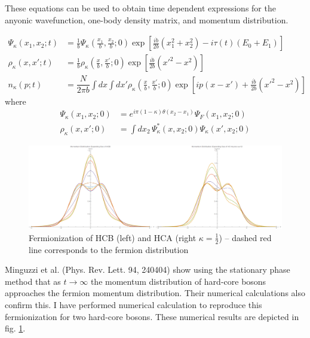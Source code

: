 \documentclass[onecolumn,english,aps,pra]{revtex4}
\begin{document}
These equations can be used to obtain time dependent expressions for the anyonic wavefunction, one-body density matrix, and momentum distribution.

\begin{align*}
\Psi_{\kappa}(x_{1}, x_{2}; t) & = 
\frac{1}{b} \Psi_{\kappa}(\frac{x_{1}}{b}, \frac{x_{2}}{b}; 0)
\exp \left[ \frac{i \dot{b}}{2 b} (x_{1}^2 + x_{2}^2) - i \tau(t) (E_0 + E_1) \right]\\
\rho_{\kappa}(x, x'; t) & = \frac{1}{b} \rho_{\kappa}(\frac{x}{b}, \frac{x'}{b}; 0)
\exp \left[ \frac{i \dot{b}}{2 b} (x'^2 - x^2) \right]\\
n_{\kappa}(p ; t) & = \dfrac{N}{2\pi b} \int dx \int dx' 
\rho_{\kappa}(\frac{x}{b}, \frac{x'}{b}; 0)
\exp \left[ip(x - x') +	 \frac{i \dot{b}}{2 b} (x'^2 - x^2) \right]
\end{align*}
where
\begin{align*}
\Psi_{\kappa}(x_{1}, x_{2}; 0) & = 
e^{i \pi (1 - \kappa) \theta(x_{2} - x_{1})} \Psi_{F}(x_{1}, x_{2}; 0)\\
\rho_{\kappa}(x, x'; 0) & = \int dx_2 \, \Psi_{\kappa}^*(x,x_2; 0) \Psi_\kappa(x',x_2; 0)
\end{align*}

\begin{center}
\begin{figure}[h!]
	\includegraphics[scale=.43]{"../Plots/MomDistExpandingPair"}
	\caption{Fermionization of HCB (left) and HCA (right $\kappa = \frac{1}{2}$) -- dashed red line corresponds to the fermion distribution}
	\label{fig:HCBFermionizationPair}
\end{figure}
\end{center}

Minguzzi et al. (Phys. Rev. Lett. 94, 240404) show using the stationary phase method that as $t \rightarrow \infty$ the momentum distribution of hard-core bosons approaches the fermion momentum distribution. Their numerical calculations also confirm this. I have performed numerical calculation to reproduce this fermionization for two hard-core bosons. These numerical results are depicted in fig. \ref{fig:HCBFermionizationPair}. 
\end{document}

